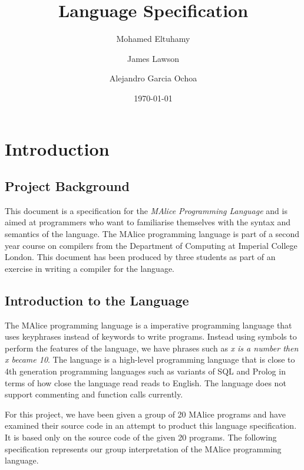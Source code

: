 \documentclass[a4wide, 10pt]{article}
\begin{document}
\title{Language Specification}

\author{Mohamed Eltuhamy \and James Lawson \and Alejandro Garcia Ochoa}

\date{\today}         %

\maketitle            %

\section{Introduction}

\subsection{Project Background}

This document is a specification for the \emph{MAlice Programming Language} and is aimed at programmers who
want to familiarise themselves with the syntax and semantics of the language.  The MAlice programming
language is part of a second year course on compilers from the Department of Computing at Imperial College
London. This document has been produced by three students as part of an exercise in writing a compiler for
the language.

\subsection{Introduction to the Language}

The MAlice programming language is a imperative programming language that uses keyphrases
instead of keywords to write programs. Instead using symbols to perform the features of the language,
we have phrases such as \emph{x is a number then x became 10}. The language is a high-level programming language that 
is close to 4th generation programming languages such as variants of SQL and Prolog in terms 
of how close the language read reads to English. The language does not support commenting and function calls currently.

For this project, we have been given a group of 20 MAlice programs and have examined 
their source code in an attempt to product this language specification. It is based only
on the source code of the given 20 programs. The following specification represents
our group interpretation of the MAlice programming language.
\end{document}
